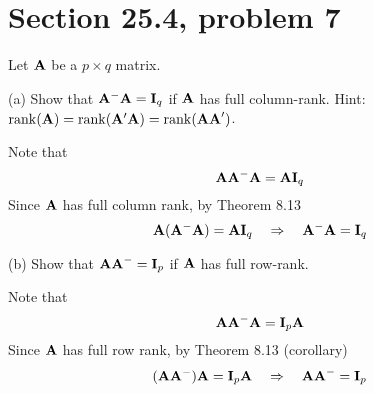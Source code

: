 \section{Section 25.4, problem 7}
Let $\bf A$ be a $p\times q$ matrix.

\bigskip
\noindent
(a) Show that ${\bf A}^{-{}}{\bf A}={\bf I}_q$ if $\bf A$ has full
column-rank.
Hint: $\mathop{\rm rank}({\bf A})
=\mathop{\rm rank}({\bf A}'{\bf A})
=\mathop{\rm rank}({\bf AA}')$.

\bigskip
\noindent
Note that
$${\bf A}{\bf A}^{-{}}{\bf A}={\bf A}{\bf I}_q$$
Since $\bf A$ has full column rank, by Theorem 8.13
$${\bf A}({\bf A}^{-{}}{\bf A})={\bf A}{\bf I}_q
\quad\Rightarrow\quad
{\bf A}^{-{}}{\bf A}={\bf I}_q
$$

\bigskip
\noindent
(b) Show that ${\bf AA}^{-{}}={\bf I}_p$ if $\bf A$ has full
row-rank.

\bigskip
\noindent
Note that
$${\bf A}{\bf A}^{-{}}{\bf A}={\bf I}_p{\bf A}$$
Since $\bf A$ has full row rank, by Theorem 8.13 (corollary)
$$({\bf A}{\bf A}^{-{}}){\bf A}={\bf I}_p{\bf A}
\quad\Rightarrow\quad
{\bf AA}^{-{}}={\bf I}_p
$$
